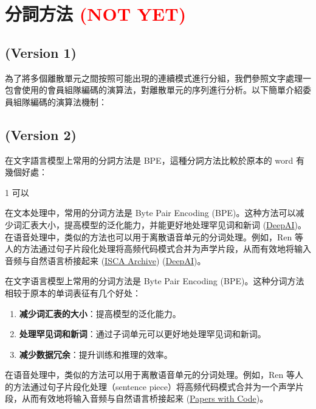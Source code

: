 \section{分詞方法 \textcolor{red}{(NOT YET)}}  %

\subsection{(Version 1)}

為了將多個離散單元之間按照可能出現的連續模式進行分組，我們參照文字處理一包會使用的會員組隊編碼的演算法，對離散單元的序列進行分析。以下簡單介紹委員組隊編碼的演算法機制：





\myhline
\subsection{(Version 2)}


在文字語言模型上常用的分詞方法是 BPE，這種分詞方法比較於原本的 word 有幾個好處：

1 可以


 在文本处理中，常用的分词方法是 Byte Pair Encoding (BPE)。这种方法可以减少词汇表大小，提高模型的泛化能力，并能更好地处理罕见词和新词 (\href{https://deepai.org/publication/speech-pre-training-with-acoustic-piece}{DeepAI})。在语音处理中，类似的方法也可以用于离散语音单元的分词处理。例如，Ren 等人的方法通过句子片段化处理将高频代码模式合并为声学片段，从而有效地将输入音频与自然语言桥接起来 (\href{https://www.isca-archive.org/interspeech_2022/ren22_interspeech.html}{ISCA Archive}) (\href{https://deepai.org/publication/speech-pre-training-with-acoustic-piece}{DeepAI})。 




在文字语言模型上常用的分词方法是 Byte Pair Encoding (BPE)。这种分词方法相较于原本的单词表征有几个好处：

\begin{enumerate}
    \item \textbf{减少词汇表的大小}：提高模型的泛化能力。
    \item \textbf{处理罕见词和新词}：通过子词单元可以更好地处理罕见词和新词。
    \item \textbf{减少数据冗余}：提升训练和推理的效率。
\end{enumerate}
在语音处理中，类似的方法可以用于离散语音单元的分词处理。例如，Ren 等人的方法通过句子片段化处理（sentence piece）将高频代码模式合并为一个声学片段，从而有效地将输入音频与自然语言桥接起来 (\href{https://paperswithcode.com/paper/speech-pre-training-with-acoustic-piece}{Papers with Code})。

